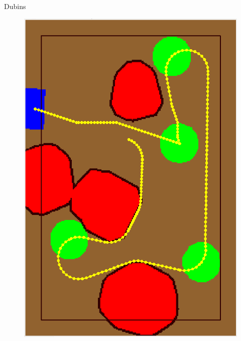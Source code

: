 \begin{frame}[fragile]{Dubins}
\begin{figure}[H]
\begin{minipage}{0.45\linewidth}
		\includegraphics[scale=0.19]{Immagini/map3}
	\end{minipage}
\end{figure}
\end{frame}

